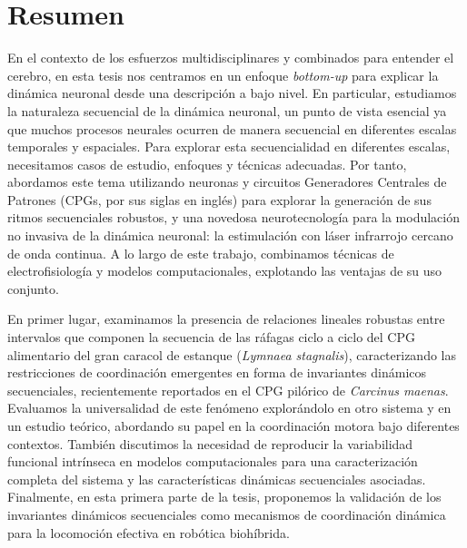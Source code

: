 \chapter*{Resumen}
En el contexto de los esfuerzos multidisciplinares y combinados para entender el cerebro, en esta tesis nos centramos en un enfoque \textit{bottom-up} para explicar la dinámica neuronal desde una descripción a bajo nivel. En particular, estudiamos la naturaleza secuencial de la dinámica neuronal, un punto de vista esencial ya que muchos procesos neurales ocurren de manera secuencial en diferentes escalas temporales y espaciales. Para explorar esta secuencialidad en diferentes escalas, necesitamos casos de estudio, enfoques y técnicas adecuadas. Por tanto, abordamos este tema utilizando neuronas y circuitos Generadores Centrales de Patrones (CPGs, por sus siglas en inglés) para explorar la generación de sus ritmos secuenciales robustos, y una novedosa neurotecnología para la modulación no invasiva de la dinámica neuronal: la estimulación con láser infrarrojo cercano de onda continua. A lo largo de este trabajo, combinamos técnicas de electrofisiología y modelos computacionales, explotando las ventajas de su uso conjunto.

En primer lugar, examinamos la presencia de relaciones lineales robustas entre intervalos que componen la secuencia de las ráfagas ciclo a ciclo del CPG alimentario del gran caracol de estanque (\textit{Lymnaea stagnalis}), caracterizando las restricciones de coordinación emergentes en forma de invariantes dinámicos secuenciales, recientemente reportados en el CPG pilórico de \textit{Carcinus maenas}. Evaluamos la universalidad de este fenómeno explorándolo en otro sistema y en un estudio teórico, abordando su papel en la coordinación motora bajo diferentes contextos. También discutimos la necesidad de reproducir la variabilidad funcional intrínseca en modelos computacionales para una caracterización completa del sistema y las características dinámicas secuenciales asociadas. Finalmente, en esta primera parte de la tesis, proponemos la validación de los invariantes dinámicos secuenciales como mecanismos de coordinación dinámica para la locomoción efectiva en robótica biohíbrida.

